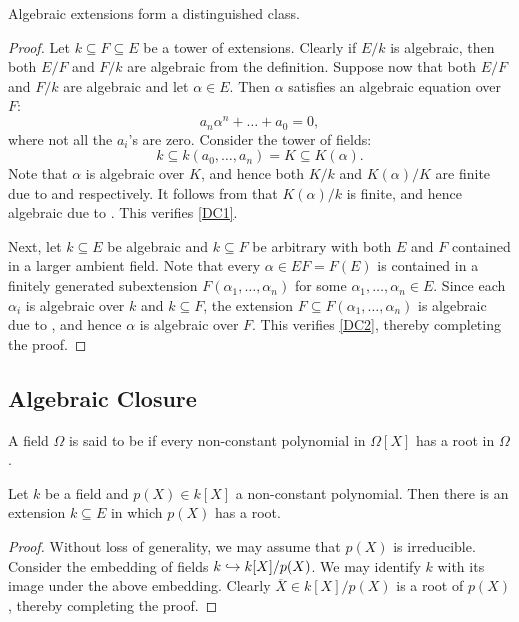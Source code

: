 \begin{theorem}
    Algebraic extensions form a distinguished class. 
\end{theorem}
\begin{proof}
    Let $k\subseteq F\subseteq E$ be a tower of extensions. Clearly if $E/k$ is algebraic, then both $E/F$ and $F/k$ are algebraic from the definition. Suppose now that both $E/F$ and $F/k$ are algebraic and let $\alpha\in E$. Then $\alpha$ satisfies an algebraic equation over $F$: 
    \begin{equation*}
        a_n\alpha^n + \dots + a_0 = 0,
    \end{equation*}
    where not all the $a_i$'s are zero. Consider the tower of fields: 
    \begin{equation*}
        k\subseteq k(a_0,\dots,a_n) = K\subseteq K(\alpha).
    \end{equation*}
    Note that $\alpha$ is algebraic over $K$, and hence both $K/k$ and $K(\alpha)/K$ are finite due to  and  respectively. It follows from  that $K(\alpha)/k$ is finite, and hence algebraic due to . This verifies \ref{DC1}.

    Next, let $k\subseteq E$ be algebraic and $k\subseteq F$ be arbitrary with both $E$ and $F$ contained in a larger ambient field. Note that every $\alpha\in EF = F(E)$ is contained in a finitely generated subextension $F(\alpha_1,\dots,\alpha_n)$ for some $\alpha_1,\dots,\alpha_n\in E$. Since each $\alpha_i$ is algebraic over $k$ and $k\subseteq F$, the extension $F\subseteq F(\alpha_1,\dots,\alpha_n)$ is algebraic due to , and hence $\alpha$ is algebraic over $F$. This verifies \ref{DC2}, thereby completing the proof.
\end{proof}

\subsection{Algebraic Closure}

\begin{definition}
    A field $\Omega$ is said to be  if every non-constant polynomial in $\Omega[X]$ has a root in $\Omega$.
\end{definition}

\begin{lemma}
    Let $k$ be a field and $p(X)\in k[X]$ a non-constant polynomial. Then there is an extension $k\subseteq E$ in which $p(X)$ has a root.
\end{lemma}
\begin{proof}
    Without loss of generality, we may assume that $p(X)$ is irreducible. Consider the embedding of fields $k\hookrightarrow k[X]/p(X)$. We may identify $k$ with its image under the above embedding. Clearly $\overline X\in k[X]/p(X)$ is a root of $p(X)$, thereby completing the proof.
\end{proof}

